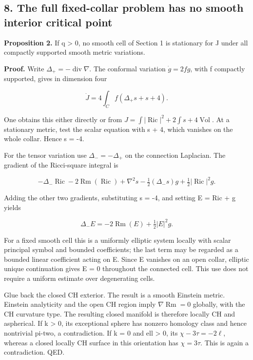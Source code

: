 \documentclass[
  10pt,
]{article}
\begin{document}
\hypertarget{the-full-fixed-collar-problem-has-no-smooth-interior-critical-point}{%
\subsection{8. The full fixed-collar problem has no smooth interior
critical
point}\label{the-full-fixed-collar-problem-has-no-smooth-interior-critical-point}}

\textbf{Proposition 2.} If q \textgreater{} 0, no smooth cell of Section
1 is stationary for J under all compactly supported smooth metric
variations.

\textbf{Proof.} Write \(\Delta_+=-\operatorname{div}\nabla\). The
conformal variation \(\dot g=2fg\), with f compactly supported, gives in
dimension four

\[
             \dot J=4\int_C f(\Delta_+s+s+4).             \tag{8.1}
\]

One obtains this either directly or from
\(J=\int|\operatorname{Ric}|^2+2\int s+4\operatorname{Vol}\). At a
stationary metric, test the scalar equation with s + 4, which vanishes
on the whole collar. Hence s = -4.

For the tensor variation use \(\Delta_-=-\Delta_+\) on the connection
Laplacian. The gradient of the Ricci-square integral is

\[
 -\Delta_-\operatorname{Ric}-2\operatorname{Rm}(\operatorname{Ric})
 +\nabla^2s-\tfrac12(\Delta_-s)g+\tfrac12|\operatorname{Ric}|^2g.
\]

Adding the other two gradients, substituting s = -4, and setting E = Ric
+ g yields

\[
       \Delta_-E=-2\operatorname{Rm}(E)+\tfrac12|E|^2g.     \tag{8.2}
\]

For a fixed smooth cell this is a uniformly elliptic system locally with
scalar principal symbol and bounded coefficients; the last term may be
regarded as a bounded linear coefficient acting on E. Since E vanishes
on an open collar, elliptic unique continuation gives E = 0 throughout
the connected cell. This use does not require a uniform estimate over
degenerating cells.

Glue back the closed CH exterior. The result is a smooth Einstein
metric. Einstein analyticity and the open CH region imply
\(\nabla\operatorname{Rm}=0\) globally, with the CH curvature type. The
resulting closed manifold is therefore locally CH and aspherical. If k
\textgreater{} 0, its exceptional sphere has nonzero homology class and
hence nontrivial pi-two, a contradiction. If k = 0 and ell
\textgreater{} 0, its \(\chi-3\tau=-2\ell\), whereas a closed locally CH
surface in this orientation has \(\chi=3\tau\). This is again a
contradiction. QED.
\end{document}
